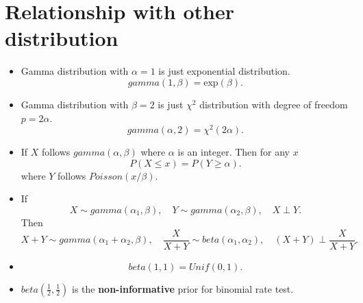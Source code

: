 \documentclass[a4paper,12pt]{article}
\begin{document}
\section{Relationship with other distribution}
\label{sec:relat-other-distr}

\begin{itemize}
\item Gamma distribution with $\alpha = 1$ is just exponential distribution.
  \[
    gamma\left(1, \beta\right) = \mathrm{exp}\left(\beta\right)
    .
  \]
  
\item Gamma distribution with $\beta = 2$ is just $\chi^2$ distribution with degree of freedom $p = 2\alpha$.
  \[
    gamma\left(\alpha, 2\right) = \chi^2\left(2\alpha\right)
    .
  \]
  
\item If $X$ follows $gamma\left(\alpha, \beta\right)$ where $\alpha$ is an integer. Then for any $x$
  \[
    P\left(X \leq x\right) = P\left(Y \geq \alpha\right)
    .
  \]
  where $Y$ follows $Poisson\left(x / \beta\right)$.
  
\item If
  \[
    X \sim gamma\left(\alpha_1, \beta\right)
    ,\quad
    Y \sim gamma\left(\alpha_2, \beta\right)
    ,\quad
    X \perp Y
    .
  \]
  Then
  \[
    X + Y \sim gamma\left(\alpha_1 + \alpha_2, \beta\right)
    ,\quad
    \frac{X}{X + Y} \sim beta\left(\alpha_1, \alpha_2\right)
    ,\quad
    \left(X + Y\right) \perp \frac{X}{X + Y}
    .
  \]
\item
  \[
    beta\left(1, 1\right) = Unif\left(0, 1\right)
    .
  \]
  
\item $beta\left(\frac{1}{2}, \frac{1}{2}\right)$ is the \textbf{non-informative} prior for binomial rate test.
\end{itemize}



\end{document}
